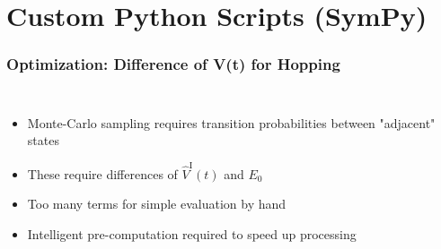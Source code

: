 \section{Custom Python Scripts (SymPy)}
    \begin{frame}
        \frametitle{Optimization: Difference of V(t) for Hopping}

        \begin{columns}
                \begin{itemize}
                    \item Monte-Carlo sampling requires transition probabilities between "adjacent" states
                    \item These require differences of $\hat{V}^\mathrm{I}(t)$ and $E_0$
                    \item Too many terms for simple evaluation by hand
                    \item Intelligent pre-computation required to speed up processing
                \end{itemize}
                
        \end{columns}

        \onslide %
    \end{frame}

